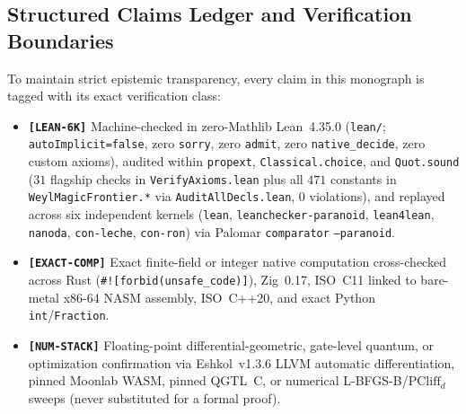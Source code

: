 \documentclass[11pt,letterpaper]{article}
\theoremstyle{plain}
\theoremstyle{definition}
\theoremstyle{remark}
\newcommand{\PCliff}{\mathrm{PCliff}}
\newcommand{\tagbadge}[1]{\textnormal{\texttt{\small [#1]}}}
\begin{document}
\subsection{Structured Claims Ledger and Verification Boundaries}
\label{sec:claims-ledger}

To maintain strict epistemic transparency, every claim in this monograph is tagged with its exact verification class:
\begin{itemize}[leftmargin=2em,itemsep=2pt]
  \item \textbf{\tagbadge{LEAN-6K}} Machine-checked in zero-Mathlib Lean~4.35.0 (\texttt{lean/}; \texttt{auto\allowbreak Implicit=\allowbreak false}, zero \texttt{sorry}, zero \texttt{admit}, zero \texttt{native\_\allowbreak decide}, zero custom axioms), audited within \texttt{propext}, \texttt{Classical.\allowbreak choice}, and \texttt{Quot.\allowbreak sound} ($31$ flagship checks in \texttt{Verify\allowbreak Axioms.lean} plus all $471$ constants in \texttt{WeylMagic\allowbreak Frontier.*} via \texttt{AuditAll\allowbreak Decls.lean}, $0$ violations), and replayed across six independent kernels (\texttt{lean}, \texttt{leanchecker-\allowbreak paranoid}, \texttt{lean4lean}, \texttt{nanoda}, \texttt{con-leche}, \texttt{con-ron}) via Palomar \texttt{comparator} \texttt{--paranoid}.
  \item \textbf{\tagbadge{EXACT-COMP}} Exact finite-field or integer native computation cross-checked across Rust (\texttt{\#![forbid(\allowbreak unsafe\_\allowbreak code)]}), Zig~0.17, ISO~C11 linked to bare-metal x86-64 NASM assembly, ISO~C++20, and exact Python \texttt{int}/\texttt{Fraction}.
  \item \textbf{\tagbadge{NUM-STACK}} Floating-point differential-geometric, gate-level quantum, or optimization confirmation via Eshkol~v1.3.6 LLVM automatic differentiation, pinned Moonlab WASM, pinned QGTL~C, or numerical L-BFGS-B/$\PCliff_d$ sweeps (never substituted for a formal proof).
\end{itemize}
\end{document}
